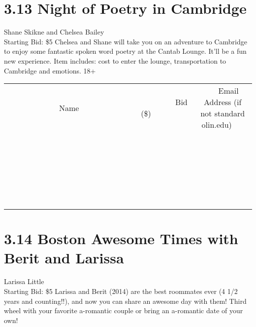 \documentclass[11pt]{article}
\begin{document}
\section*{3.13 Night of Poetry in Cambridge}
Shane Skikne and Chelsea Bailey
\\
Starting Bid: \$5
\newline
Chelsea and Shane will take you on an adventure to Cambridge to enjoy some fantastic spoken word poetry at the Cantab Lounge. It'll be a fun new experience. Item includes: cost to enter the lounge, transportation to Cambridge and emotions.  
  18+
\\[6ex]
\begin{tabular}{c c c}
~~~~~~~~~~~~~Name~~~~~~~~~~~~~ & ~~~~~~~~~Bid (\$)~~~~~~~~~  & ~~~Email Address (if not standard olin.edu)~~~\\
 & & \\
\hline
 & & \\
\hline
 & & \\
\hline
 & & \\
\hline
 & & \\
\hline
 & & \\
\hline
 & & \\
\hline
 & & \\
\hline
 & & \\
\hline
 & & \\
\hline
 & & \\
\hline
 & & \\
\hline
 & & \\
\hline
 & & \\
\hline
 & & \\
\hline
 & & \\
\hline
 & & \\
\hline
 & & \\
\hline
 & & \\
\hline
 & & \\
\hline
 & & \\
\hline
 & & \\
\hline
 & & \\
\hline
 & & \\
\hline
 & & \\
\hline
 & & \\
\hline
\end{tabular}
\newpage
\section*{3.14 Boston Awesome Times with Berit and Larissa}
Larissa Little
\\
Starting Bid: \$5
\newline
Larissa and Berit (2014) are the best roommates ever (4 1/2 years and counting!!), and now you can share an awesome day with them! Third wheel with your favorite a-romantic couple or bring an a-romantic date of your own!
\end{document}
